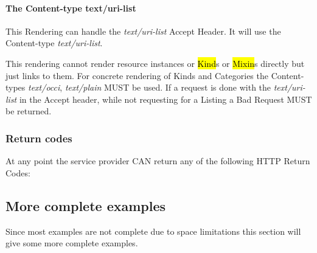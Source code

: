 \documentclass[10pt,a4paper]{article}
\begin{document}
\paragraph{The Content-type text/uri-list}
This Rendering can handle the \textit{text/uri-list} Accept Header. It
will use the Content-type \textit{text/uri-list}.

This rendering cannot render resource instances or \hl{Kind}s or
\hl{Mixin}s directly but just links to them. For concrete rendering of
Kinds and Categories the Content-types \textit{text/occi},
\textit{text/plain} MUST be used. If a request is done with the
\textit{text/uri-list} in the Accept header, while not requesting for
a Listing a Bad Request MUST be returned.

\subsubsection{Return codes}
\label{sec:return_codes}
At any point the service provider CAN return any of the following HTTP
Return Codes:


\subsection{More complete examples}
Since most examples are not complete due to space limitations this
section will give some more complete examples.
\end{document}
